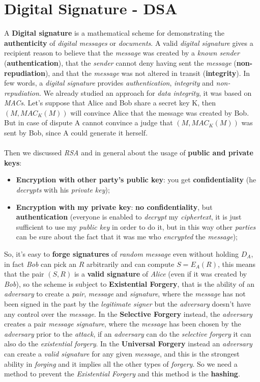 \documentclass{article}
\begin{document}
\section{Digital Signature - DSA}
A \textbf{Digital signature} is a mathematical scheme for demonstrating the \textbf{authenticity} of \emph{digital messages} or \emph{documents}. A valid \emph{digital signature} gives a recipient reason to believe that the \emph{message} was created by a \emph{known sender} (\textbf{authentication}), that the \emph{sender} cannot deny having sent the \emph{message} (\textbf{non-repudiation}), and that the \emph{message} was not altered in transit (\textbf{integrity}). In few words, a \emph{digital signature} provides \emph{authentication}, \emph{integrity} and \emph{non-repudiation}. We already studied an approach for \emph{data integrity}, it was based on \emph{MACs}. Let's suppose that Alice and Bob share a secret key K, then $(M,MAC_K(M))$ will convince Alice that the message was created by Bob. But in case of dispute A cannot convince a judge that $(M,MAC_K(M))$ was sent by Bob, since A could generate it herself. \\\\
Then we discussed \emph{RSA} and in general about the usage of \textbf{public and private keys}:
\begin{itemize}
\item \textbf{Encryption with other party’s public key}: you get \textbf{confidentiality} (he \emph{decrypts} with his \emph{private key});
\item \textbf{Encryption with my private key}:\textbf{ no confidentiality}, but \textbf{authentication} (everyone is enabled to \emph{decrypt} my \emph{ciphertext}, it is just sufficient to use my \emph{public key} in order to do it, but in this way other \emph{parties} can be sure about the fact that it was me who \emph{encrypted} the \emph{message});
\end{itemize}
So, it's easy to \textbf{forge signatures} of \emph{random message} even without holding $D_A$, in fact \emph{Bob} can pick an $R$ arbitrarily and can compute $S=E_A(R)$, this means that the pair $(S,R)$ is a \textbf{valid signature} of \emph{Alice} (even if it was created by \emph{Bob}), so the scheme is subject to \textbf{Existential Forgery}, that is the ability of an \emph{adversary} to create a \emph{pair}, \emph{message} and \emph{signature}, where the \emph{message} has not been signed in the past by the \emph{legitimate signer} but the \emph{adversary} doesn't have any control over the \emph{message}. In the \textbf{Selective Forgery} instead, the \emph{adversary} creates a pair \emph{message signature}, where the \emph{message} has been chosen by the \emph{adversary} prior to the \emph{attack}, if an \emph{adversary} can do the \emph{selective forgery} it can also do the \emph{existential forgery}. In the \textbf{Universal Forgery} instead an \emph{adversary} can create a \emph{valid signature} for any given \emph{message}, and this is the strongest ability in \emph{forging} and it implies all the other types of \emph{forgery}. So we need a method to prevent the \emph{Existential Forgery} and this method is the \textbf{hashing}. \\\\
\end{document}
